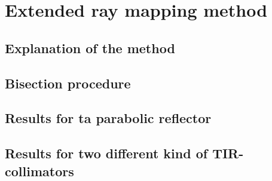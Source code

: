 \chapter{Extended ray mapping method}
\section{Explanation of the method}
\section{Bisection procedure}
\section{Results for ta parabolic reflector}
\section{Results for two different kind of TIR-collimators}